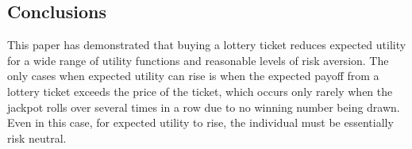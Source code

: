 \documentclass[letterpaper,12pt]{article}
\numberwithin{equation}{section}
\numberwithin{figure}{section}
\numberwithin{table}{section}
\begin{document}
\begin{spacing}{1.5}
\FloatBarrier

\section{Conclusions} \label{sec_concl}

	This paper has demonstrated that buying a lottery ticket reduces expected utility for a wide range of utility functions and reasonable levels of risk aversion.  The only cases when expected utility can rise is when the expected payoff from a lottery ticket exceeds the price of the ticket, which occurs only rarely when the jackpot rolls over several times in a row due to no winning number being drawn.  Even in this case, for expected utility to rise, the individual must be essentially risk neutral.
	

%

\end{spacing}
\end{document}
